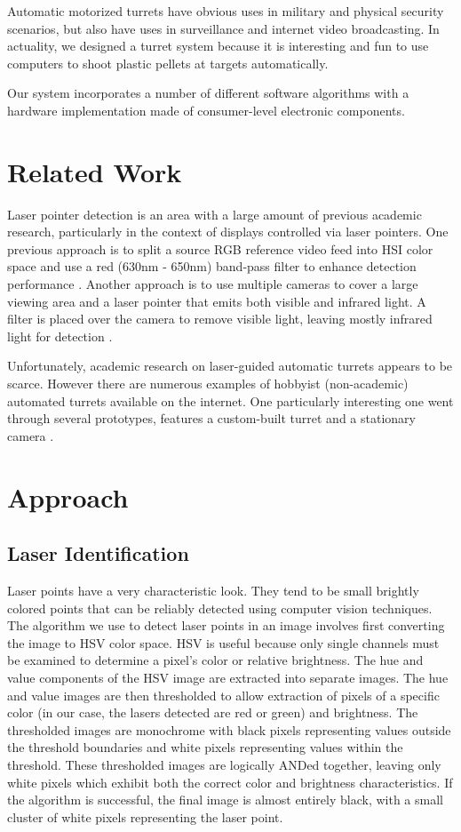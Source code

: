 \documentclass[10pt,twocolumn,letterpaper]{article}
\begin{document}
Automatic motorized turrets have obvious uses in military and physical security scenarios, but also have uses in surveillance and internet video broadcasting.  In actuality, we designed a turret system because it is interesting and fun to use computers to shoot plastic pellets at targets automatically.

Our system incorporates a number of different software algorithms with a hardware implementation made of consumer-level electronic components.

\section{Related Work}

Laser pointer detection is an area with a large amount of previous academic research, particularly in the context of displays controlled via laser pointers.  One previous approach is to split a source RGB reference video feed into HSI color space and use a red (630nm - 650nm) band-pass filter to enhance detection performance \cite{DBLP:conf/hci/KimLLL07}.  Another approach is to use multiple cameras to cover a large viewing area and a laser pointer that emits both visible and infrared light.  A filter is placed over the camera to remove visible light, leaving mostly infrared light for detection \cite{König200715925196}.

Unfortunately, academic research on laser-guided automatic turrets appears to be scarce.  However there are numerous examples of hobbyist (non-academic) automated turrets available on the internet.  One particularly interesting one went through several prototypes, features a custom-built turret and a stationary camera \cite{defcon}.

\section{Approach}

\subsection{Laser Identification}

Laser points have a very characteristic look. They tend to be small brightly colored points that can be reliably detected using computer vision techniques. The algorithm we use to detect laser points in an image involves first converting the image to HSV color space. HSV is useful because only single channels must be examined to determine a pixel's color or relative brightness. The hue and value components of the HSV image are extracted into separate images. The hue and value images are then thresholded to allow extraction of pixels of a specific color (in our case, the lasers detected are red or green) and brightness.  The thresholded images are monochrome with black pixels representing values outside the threshold boundaries and white pixels representing values within the threshold.  These thresholded images are logically ANDed together, leaving only white pixels which exhibit both the correct color and brightness characteristics.  If the algorithm is successful, the final image is almost entirely black, with a small cluster of white pixels representing the laser point.
\end{document}
